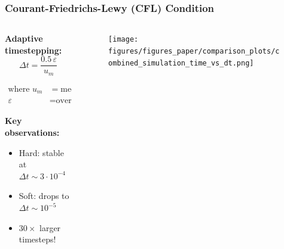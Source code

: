 \documentclass[10pt,t]{beamer}
\begin{document}
\begin{frame}
    \frametitle{Courant-Friedrichs-Lewy (CFL) Condition}

    \begin{columns}
        \begin{column}{0.52\textwidth}
            \textbf{Adaptive timestepping:}
            \begin{equation*}
                \Delta t = \frac{0.5 \, \varepsilon}{u_m}
            \end{equation*}

            \vspace{-0.5cm}

            \begin{equation*}
                \begin{align}
                    \text{where }   u_m & = \text{median velocity},  \\
                    \varepsilon         & = \text{overlap tolerance}
                \end{align}
            \end{equation*}

            \textbf{Key observations:}
            \begin{itemize}
                \item Hard: stable at $\Delta t \sim 3 \cdot 10^{-4}$
                \item Soft: drops to $\Delta t \sim 10^{-5}$
                \item $30\times$ larger timesteps!
            \end{itemize}
        \end{column}

        \begin{column}{0.52\textwidth}
            \begin{figure}
                \centering
                \texttt{[image: figures/figures\_paper/comparison\_plots/combined\_simulation\_time\_vs\_dt.png]}
            \end{figure}
        \end{column}
    \end{columns}

\end{frame}
\end{document}
